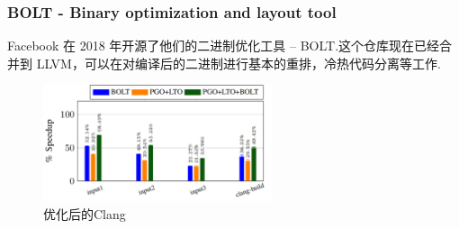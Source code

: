 \begin{frame}
    \frametitle{BOLT - Binary optimization and layout tool}

    Facebook 在 2018 年开源了他们的二进制优化工具 -- BOLT\cite{facebook2018bolt, panchenko2019bolt}.这个仓库现在已经合并到 LLVM，可以在对编译后的二进制进行基本的重排，冷热代码分离等工作.

    \begin{figure}
        \centering
        \includegraphics[width=0.6\textwidth]{images/perf_improv_clang.png}
        \caption{优化后的Clang}
    \end{figure}

\end{frame}